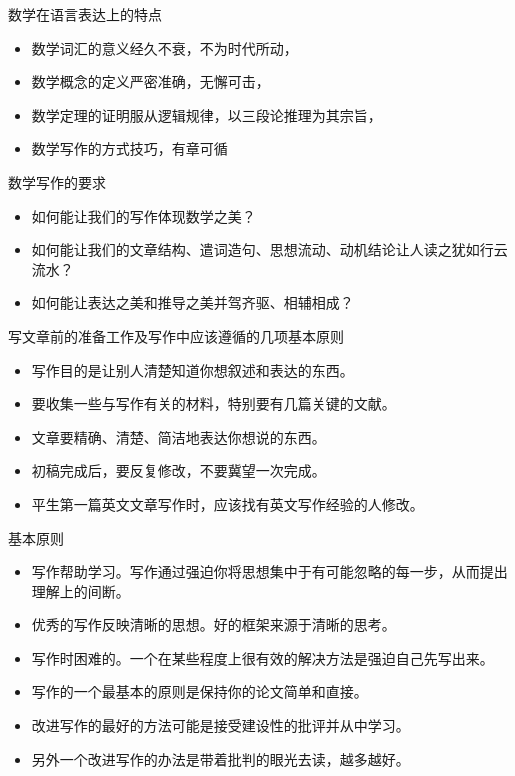 \documentclass[13pt]{ctexbeamer}
\begin{document}
\begin{frame}
	数学在语言表达上的特点
	\begin{itemize}
		\item 数学词汇的意义经久不衰，不为时代所动，
		\item 数学概念的定义严密准确，无懈可击，
		\item 数学定理的证明服从逻辑规律，以三段论推理为其宗旨，
		\item 数学写作的方式技巧，有章可循
	\end{itemize}
\vspace{15pt}
\pause
	数学写作的要求
\begin{itemize}
	\item 如何能让我们的写作体现数学之美？
	\item 如何能让我们的文章结构、遣词造句、思想流动、动机结论让人读之犹如行云流水？
	\item 如何能让表达之美和推导之美并驾齐驱、相辅相成？
\end{itemize}
\end{frame}




\begin{frame}
	写文章前的准备工作及写作中应该遵循的几项基本原则
	\begin{itemize}
		\item  写作目的是让别人清楚知道你想叙述和表达的东西。
		\item 要收集一些与写作有关的材料，特别要有几篇关键的文献。
		\item 文章要精确、清楚、简洁地表达你想说的东西。
		\item 初稿完成后，要反复修改，不要冀望一次完成。
		\item 平生第一篇英文文章写作时，应该找有英文写作经验的人修改。
	\end{itemize}
\end{frame}

\begin{frame}{基本原则}

\begin{itemize}
	\item  写作帮助学习。写作通过强迫你将思想集中于有可能忽略的每一步，从而提出理解上的间断。
	\item 优秀的写作反映清晰的思想。好的框架来源于清晰的思考。
	\item  写作时困难的。一个在某些程度上很有效的解决方法是强迫自己先写出来。
	\item 写作的一个最基本的原则是保持你的论文简单和直接。
	\item 改进写作的最好的方法可能是接受建设性的批评并从中学习。
	\item 另外一个改进写作的办法是带着批判的眼光去读，越多越好。
\end{itemize}
\end{frame}
\end{document}
